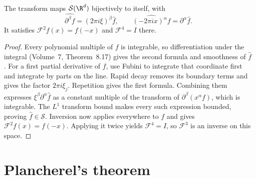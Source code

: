 \begin{proposition}\label{prop:schwartz}
The transform maps $\mathcal S(\R^d)$ bijectively to itself, with
\[
\widehat{\partial^\beta f}=(2\pi i\xi)^\beta\hat f,\qquad
\widehat{(-2\pi ix)^\alpha f}=\partial^\alpha\hat f.
\]
It satisfies $\mathcal F^2f(x)=f(-x)$ and $\mathcal F^4=I$ there.
\end{proposition}
\begin{proof}
Every polynomial multiple of $f$ is integrable, so differentiation under the integral (Volume~7, Theorem~8.17) gives the second formula and smoothness of $\hat f$. For a first partial derivative of $f$, use Fubini to integrate that coordinate first and integrate by parts on the line. Rapid decay removes its boundary terms and gives the factor $2\pi i\xi_j$. Repetition gives the first formula. Combining them expresses $\xi^\beta\partial^\alpha\hat f$ as a constant multiple of the transform of $\partial^\beta(x^\alpha f)$, which is integrable. The $L^1$ transform bound makes every such expression bounded, proving $\hat f\in\mathcal S$.
Inversion now applies everywhere to $f$ and gives $\mathcal F^2f(x)=f(-x)$. Applying it twice yields $\mathcal F^4=I$, so $\mathcal F^3$ is an inverse on this space.
\end{proof}

\section{Plancherel's theorem}

